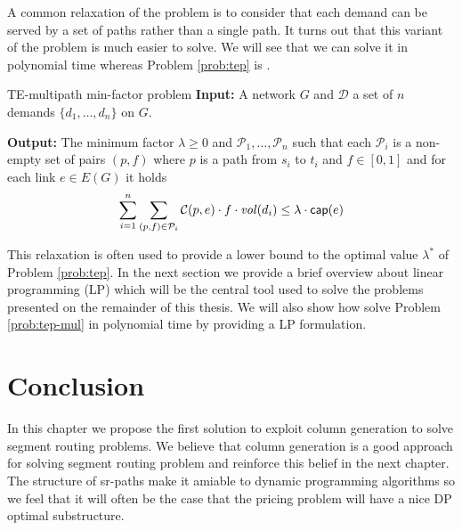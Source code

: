 A common relaxation of the problem is to consider that each demand can be served by a set of paths rather than a single path.
It turns out that this variant of the problem is much easier to solve. We will see that we can solve it in polynomial time
whereas Problem \ref{prob:tep} is \NPhard \cite{MCF}.

\begin{problem}{TE-multipath min-factor problem}
\label{prob:tep-mul}
\textbf{Input:} A network $G$ and $\mathcal{D}$ a set of $n$ demands $\{d_1, \ldots, d_n\}$ on $G$.

\textbf{Output:} The minimum factor $\lambda \geq 0$ and $\mathcal{P}_1, \ldots, \mathcal{P}_n$ such that each 
$\mathcal{P}_i$ is a non-empty set of pairs $(p, f)$ where $p$ is a path from $s_i$ to $t_i$ and $f \in [0, 1]$ and for each link $e \in E(G)$ it holds
$$
\sum_{i = 1}^n \sum_{(p, f) \in \mathcal{P}_i} \mathcal{C}(p, e) \cdot f \cdot \mathit{vol}(d_i) \leq \lambda \cdot \mathsf{cap}(e)
$$
\end{problem}

This relaxation is often used to provide a lower bound to the optimal value $\lambda^*$ of Problem \ref{prob:tep}. In the next section we provide
a brief overview about linear programming (LP) which will be the central tool used to solve the problems presented on the remainder of this thesis. We will also show how solve
Problem \ref{prob:tep-mul} in polynomial time by providing a LP formulation.









\section*{Conclusion}

In this chapter we propose                                                                                                                                                                                                                                                                                                                                                                                                                   the first solution to exploit column generation to solve segment routing problems.
We believe that column generation is a good approach for solving segment routing problem and reinforce this
belief in the next chapter. The structure of sr-paths make it amiable to dynamic programming algorithms so
we feel that it will often be the case that the pricing problem will have a nice DP optimal substructure.


